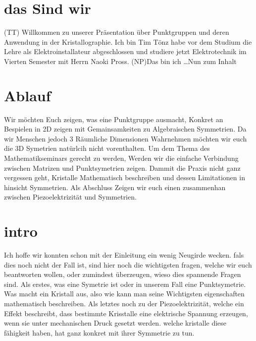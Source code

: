 \documentclass[a4paper]{article}
\begin{document}
\section{das Sind wir}
  (TT) Willkommen zu unserer Präsentation über Punktgruppen und deren Anwendung in der Kristallographie. 
  Ich bin Tim Tönz habe vor dem Studium die Lehre als Elektroinstallateur abgeschlossen und studiere jetzt Elektrotechnik im Vierten Semester mit Herrn Naoki Pross. 
  (NP)Das bin ich  \ldots  Nun zum Inhalt 

\section{Ablauf}
  Wir möchten Euch zeigen, was eine Punktgruppe ausmacht, Konkret an Bespielen in 2D zeigen mit Gemainsamkeiten zu Algebraischen Symmetrien. 
  Da wir Menschen jedoch 3 Räumliche Dimensionen Wahrnehmen möchten wir euch die 3D Symetrien natürlcih nicht vorenthalten.
  Um dem Thema des Mathematikseminars gerecht zu werden, Werden wir die einfache Verbindung zwischen Matrizen und Punktsymetrien zeigen.
  Dammit die Praxis nicht ganz vergessen geht, Kristalle Mathematisch beschreiben und dessen Limitationen in hinsicht Symmetrien. 
  Als Abschluss Zeigen wir euch einen zusammenhan zwischen Piezoelektrizität und Symmetrien.

\section{intro}
  Ich hoffe wir konnten schon mit der Einleitung ein wenig Neugirde wecken.
  fals dies noch nicht der Fall ist, sind hier noch die wichtigsten fragen, welche wir euch beantworten wollen, oder zumindest überzeugen, wieso dies spannende Fragen sind.  
  Als erstes, was eine Symetrie ist oder in unserem Fall eine Punktsymetrie.
  Was macht ein Kristall aus, also wie kann man seine Wichtigsten eigenschaften mathematisch beschreiben.
  Als letztes noch zu der Piezoelektrizität, welche ein Effekt beschreibt, dass bestimmte Krisstalle eine elektrische Spannung erzeugen, wenn sie unter mechanischen Druck gesetzt werden. 
  welche kristalle diese fähigkeit haben, hat ganz konkret mit ihrer Symmetrie zu tun.
\end{document}
